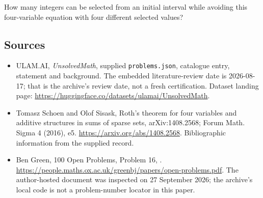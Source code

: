 \documentclass[11pt,a4paper]{article}
\begin{document}
How many integers can be selected from an initial interval while avoiding this four-variable equation with four different selected values?

\subsection{Sources}

{\small

\begin{itemize}

\item[\hypertarget{source:statement:1}{S1}] ULAM.AI, \emph{UnsolvedMath}, supplied \texttt{problems.json}, catalogue entry, statement and background. The embedded literature-review date is 2026-08-17; that is the archive’s review date, not a fresh certification. Dataset landing page: \url{https://huggingface.co/datasets/ulamai/UnsolvedMath}.

\item[\hypertarget{source:statement:2}{S2}] Tomasz Schoen and Olof Sisask, Roth's theorem for four variables and additive structures in sums of sparse sets, arXiv:1408.2568; Forum Math. Sigma 4 (2016), e5. \url{https://arxiv.org/abs/1408.2568}. Bibliographic information from the supplied record.

\item[\hypertarget{source:statement:3}{S3}] Ben Green, 100 Open Problems, Problem 16, . \url{https://people.maths.ox.ac.uk/greenbj/papers/open-problems.pdf}. The author-hosted document was inspected on 27 September 2026; the archive’s local code is not a problem-number locator in this paper.

\end{itemize}

}

\label{end:statement}
\end{document}
